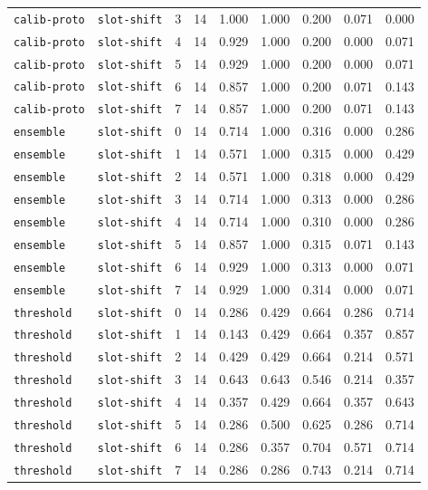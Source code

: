 \documentclass{article}
\begin{document}
\begin{center}
{\begin{tabular}{llllccccc}
\texttt{calib-proto} & \texttt{slot-shift} & 3 & 14 & 1.000 & 1.000 & 0.200 & 0.071 & 0.000 \\
\texttt{calib-proto} & \texttt{slot-shift} & 4 & 14 & 0.929 & 1.000 & 0.200 & 0.000 & 0.071 \\
\texttt{calib-proto} & \texttt{slot-shift} & 5 & 14 & 0.929 & 1.000 & 0.200 & 0.000 & 0.071 \\
\texttt{calib-proto} & \texttt{slot-shift} & 6 & 14 & 0.857 & 1.000 & 0.200 & 0.071 & 0.143 \\
\texttt{calib-proto} & \texttt{slot-shift} & 7 & 14 & 0.857 & 1.000 & 0.200 & 0.071 & 0.143 \\
\texttt{ensemble} & \texttt{slot-shift} & 0 & 14 & 0.714 & 1.000 & 0.316 & 0.000 & 0.286 \\
\texttt{ensemble} & \texttt{slot-shift} & 1 & 14 & 0.571 & 1.000 & 0.315 & 0.000 & 0.429 \\
\texttt{ensemble} & \texttt{slot-shift} & 2 & 14 & 0.571 & 1.000 & 0.318 & 0.000 & 0.429 \\
\texttt{ensemble} & \texttt{slot-shift} & 3 & 14 & 0.714 & 1.000 & 0.313 & 0.000 & 0.286 \\
\texttt{ensemble} & \texttt{slot-shift} & 4 & 14 & 0.714 & 1.000 & 0.310 & 0.000 & 0.286 \\
\texttt{ensemble} & \texttt{slot-shift} & 5 & 14 & 0.857 & 1.000 & 0.315 & 0.071 & 0.143 \\
\texttt{ensemble} & \texttt{slot-shift} & 6 & 14 & 0.929 & 1.000 & 0.313 & 0.000 & 0.071 \\
\texttt{ensemble} & \texttt{slot-shift} & 7 & 14 & 0.929 & 1.000 & 0.314 & 0.000 & 0.071 \\
\texttt{threshold} & \texttt{slot-shift} & 0 & 14 & 0.286 & 0.429 & 0.664 & 0.286 & 0.714 \\
\texttt{threshold} & \texttt{slot-shift} & 1 & 14 & 0.143 & 0.429 & 0.664 & 0.357 & 0.857 \\
\texttt{threshold} & \texttt{slot-shift} & 2 & 14 & 0.429 & 0.429 & 0.664 & 0.214 & 0.571 \\
\texttt{threshold} & \texttt{slot-shift} & 3 & 14 & 0.643 & 0.643 & 0.546 & 0.214 & 0.357 \\
\texttt{threshold} & \texttt{slot-shift} & 4 & 14 & 0.357 & 0.429 & 0.664 & 0.357 & 0.643 \\
\texttt{threshold} & \texttt{slot-shift} & 5 & 14 & 0.286 & 0.500 & 0.625 & 0.286 & 0.714 \\
\texttt{threshold} & \texttt{slot-shift} & 6 & 14 & 0.286 & 0.357 & 0.704 & 0.571 & 0.714 \\
\texttt{threshold} & \texttt{slot-shift} & 7 & 14 & 0.286 & 0.286 & 0.743 & 0.214 & 0.714 \\
\bottomrule
\end{tabular}%
}
\end{center}
\end{document}
